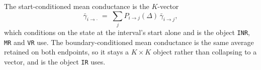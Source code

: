 \begin{appendixbox}
The start-conditioned mean conductance is the $K$-vector
\begin{equation}
  \bar{\gamma}_{i\to\cdot} \;=\; \sum_{j} P_{i\to j}(\Delta)\,\bar{\gamma}_{i\to j},
  \label{eq:gammabar}
\end{equation}
which conditions on the state at the interval's start alone and is the object \texttt{INR},
\texttt{MR} and \texttt{VR} use. The boundary-conditioned mean conductance is the same
average retained on both endpoints, so it stays a $K\times K$ object rather than collapsing
to a vector, and is the object \texttt{IR} uses.


\end{appendixbox}
